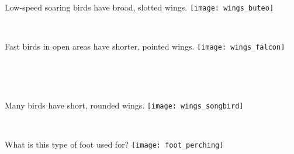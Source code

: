 {
\begin{frame}[c,plain]{Low-speed soaring birds have broad, slotted wings.}
	\centering
	\texttt{[image: wings\_buteo]}\par
\end{frame}
}

{
\begin{frame}[b,plain]
	\tiny\textcolor{white}{Turkey Vulture by Tatiana Gettleman, Flickr Creative Commons.}
\end{frame}
}


{
\begin{frame}[c,plain]{Fast birds in open areas have shorter, pointed wings.}
	\centering
	\texttt{[image: wings\_falcon]}\par
\end{frame}
}

{
\begin{frame}[b,plain]
	\tiny\hspace{10em}\textcolor{white}{Juvenile Peregrine Falcon (?) by Magnus Manske, Wikimedia Commons.}
\end{frame}
}

{
\begin{frame}[b,plain]
	\tiny\textcolor{white}{Mourning Dove \copyright Stephen Ramirez, All Rights Reserved. Used with permission.}
	\vspace{6ex}
\end{frame}
}


{
\begin{frame}[c,plain]{Many birds have short, rounded wings.}
	\centering
	\texttt{[image: wings\_songbird]}\par
\end{frame}
}

{
\begin{frame}[b,plain]
	\tiny\hspace{8em}\textcolor{white}{Yellow-rumped Warbler by Jack Sutton, Flickr Creative Commons.}
\end{frame}
}

{
\begin{frame}[c,plain]{What is this type of foot used for?}
	\centering
	\texttt{[image: foot\_perching]}\par
\end{frame}
}

